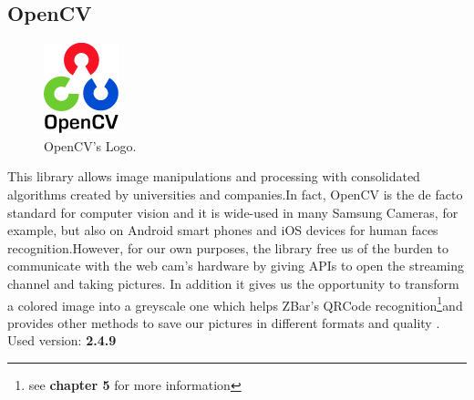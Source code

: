 \subsection{OpenCV}
\begin{figure}[hbt]
    \centering
    \includegraphics[scale=0.5]{img/opencv.png}
    \caption{OpenCV's Logo.}
\end{figure}
This library allows image manipulations and processing with consolidated algorithms created by universities and companies.In fact, OpenCV is the de facto standard for computer vision and it is wide-used in many Samsung Cameras, for example, but also on Android smart phones and iOS devices for human faces recognition.However, for our own purposes, the library free us of the burden to communicate with the web cam's hardware by giving APIs to open the streaming channel and taking pictures. In addition it gives us the opportunity to transform a colored image into a greyscale one which helps ZBar's QRCode recognition\footnote{see \textbf{chapter 5} for more information}and provides other methods to save our pictures in different formats and quality . 
\newline Used version: \textbf{2.4.9}

